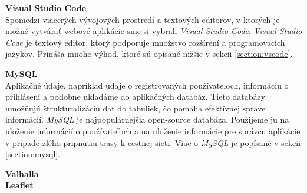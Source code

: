 \noindent\textbf{Visual Studio Code}\\
Spomedzi viacerých vývojových prostredí a textových editorov, v ktorých je možné vytvárať webové aplikácie sme si vybrali \textit{Visual Studio Code}. \textit{Visual Studio Code} je textový editor, ktorý podporuje množstvo rozšírení a programovacích jazykov. Prináša mnoho výhod, ktoré sú opísané nižšie v sekcii \ref{section:vscode}.

\noindent\textbf{MySQL}\\
Aplikačné údaje, napríklad údaje o registrovaných používateľoch, informáciu o prihlásení a podobne ukladáme do aplikačných databáz. Tieto databázy umožňujú štrukturalizáciu dát do tabuliek, čo pomáha efektívnej správe informácií. \textit{MySQL} je najpopulárnejšia open-source databáza\cite{mysql}. Použijeme ju na uloženie informácií o používateľoch a na uloženie informácie pre správcu aplikácie v prípade zlého pripnutiu trasy k cestnej sieti. Viac o \textit{MySQL} je popísané v sekcii \ref{section:mysql}.

\noindent\textbf{Valhalla}\\

\noindent\textbf{Leaflet}\\
